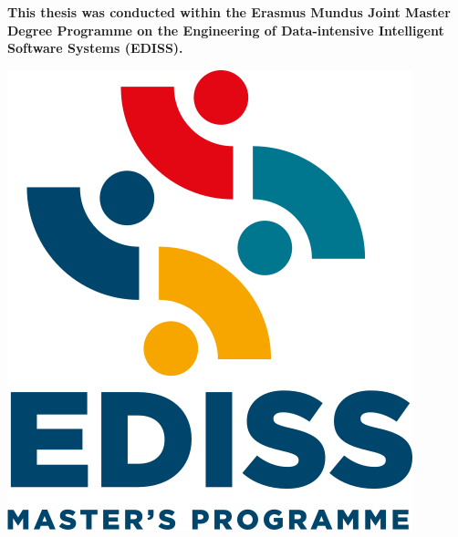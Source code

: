 \documentclass[
11pt, %
english, %
singlespacing, %
headsepline, %
]{MastersDoctoralThesis} %
\begin{document}






    \begin{center}
        \vspace*{0.2\textheight}
        
        {\textbf{This thesis was conducted within the Erasmus Mundus Joint Master Degree Programme on the Engineering of Data-intensive Intelligent Software Systems (EDISS).}}

        \vspace{2cm}

        \includegraphics[width=0.4\linewidth]{Figures/logos/EDISS_Transparent.png}

        \vspace{2cm}
    \end{center}
        






\end{document}
